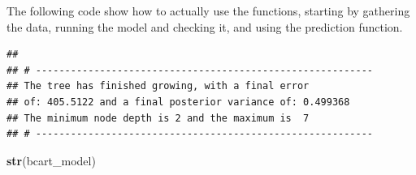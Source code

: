 \documentclass[]{article}
\newenvironment{Shaded}{\begin{snugshade}}{\end{snugshade}}
\newcommand{\CommentTok}[1]{\textcolor[rgb]{0.56,0.35,0.01}{\textit{#1}}}
\newcommand{\DataTypeTok}[1]{\textcolor[rgb]{0.13,0.29,0.53}{#1}}
\newcommand{\DecValTok}[1]{\textcolor[rgb]{0.00,0.00,0.81}{#1}}
\newcommand{\FloatTok}[1]{\textcolor[rgb]{0.00,0.00,0.81}{#1}}
\newcommand{\KeywordTok}[1]{\textcolor[rgb]{0.13,0.29,0.53}{\textbf{#1}}}
\newcommand{\NormalTok}[1]{#1}
\newcommand{\OperatorTok}[1]{\textcolor[rgb]{0.81,0.36,0.00}{\textbf{#1}}}
\newcommand{\StringTok}[1]{\textcolor[rgb]{0.31,0.60,0.02}{#1}}
\begin{document}
The following code show how to actually use the functions, starting by
gathering the data, running the model and checking it, and using the
prediction function.

\begin{Shaded}
\end{Shaded}

\begin{verbatim}
## 
## # ----------------------------------------------------------  
## The tree has finished growing, with a final error 
## of: 405.5122 and a final posterior variance of: 0.499368 
## The minimum node depth is 2 and the maximum is  7 
## # ----------------------------------------------------------
\end{verbatim}

\begin{Shaded}
\begin{Highlighting}[]
\KeywordTok{str}\NormalTok{(bcart_model)}
\end{Highlighting}
\end{Shaded}
\end{document}
